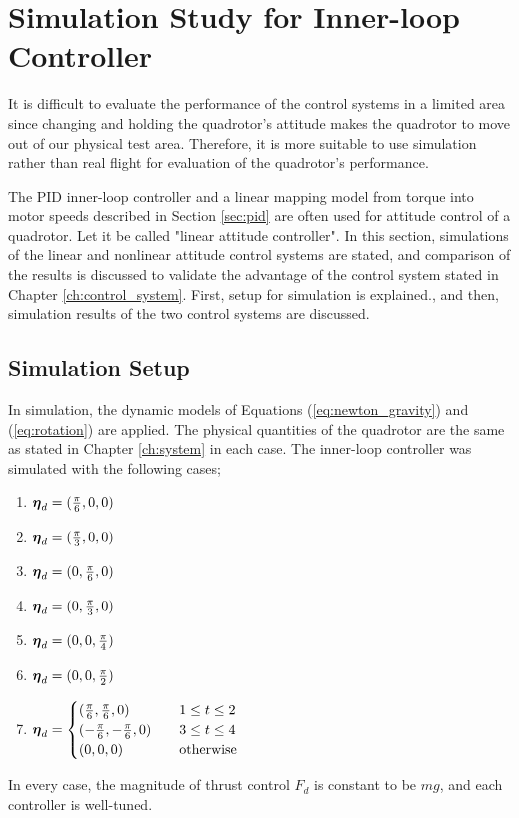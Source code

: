 \section{Simulation Study for Inner-loop Controller}
\label{sec:simulation}

It is difficult to evaluate the performance of the control systems in a limited area since changing and holding the quadrotor's attitude makes the quadrotor to move out of our physical test area. Therefore, it is more suitable to use simulation rather than real flight for evaluation of the quadrotor's performance.

The PID inner-loop controller and a linear mapping model from torque into motor speeds described in Section \ref{sec:pid} are often used for attitude control of a quadrotor. Let it be called "linear attitude controller". In this section, simulations of the linear and nonlinear attitude control systems are stated, and comparison of the results is discussed to validate the advantage of the control system stated in Chapter \ref{ch:control_system}. First, setup for simulation is explained., and then, simulation results of the two control systems are discussed.

\subsection{Simulation Setup}

In simulation, the dynamic models of Equations (\ref{eq:newton_gravity}) and (\ref{eq:rotation}) are applied. The physical quantities of the quadrotor are the same as stated in Chapter \ref{ch:system} in each case. The inner-loop controller was simulated with the following cases; \\
\begin{enumerate}
\item \({\boldsymbol \eta}_d = ({\pi \over{6}}, 0, 0)\)
\item \({\boldsymbol \eta}_d = ({\pi \over{3}}, 0, 0)\)
\item \({\boldsymbol \eta}_d = (0, {\pi \over{6}}, 0)\)
\item \({\boldsymbol \eta}_d = (0, {\pi \over{3}}, 0)\)
\item \({\boldsymbol \eta}_d = (0, 0, {\pi \over{4}})\)
\item \({\boldsymbol \eta}_d = (0, 0, {\pi \over 2})\)
\item \(
\begin{aligned}
{\boldsymbol \eta}_d = 
\begin{cases}
     ({\pi \over{6}}, {\pi \over{6}}, 0) \quad &  1 \le t \le 2 \\
    (-{\pi \over{6}}, -{\pi \over{6}}, 0) \quad & 3 \le t \le 4 \\ 
    (0, 0, 0)  \quad &  \text{otherwise} \\
  \end{cases}
  \end{aligned}
  \)
\end{enumerate}
In every case, the magnitude of thrust control \(F_d\) is constant to be \(mg\), and each controller is well-tuned. 
 
